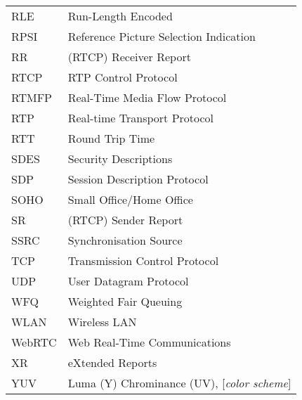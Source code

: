 \begin{longtable}{ll}
RLE  	& Run-Length Encoded \\
RPSI 	& Reference Picture Selection Indication \\
RR  	& (RTCP) Receiver Report \\
RTCP 	& RTP Control Protocol \\
RTMFP	& Real-Time Media Flow Protocol \\
RTP 	& Real-time Transport Protocol \\
RTT 	& Round Trip Time \\
SDES	& Security Descriptions \\
SDP 	& Session Description Protocol \\
SOHO 	& Small Office/Home Office \\
SR  	& (RTCP) Sender Report \\
SSRC	& Synchronisation Source \\
TCP 	& Transmission Control Protocol \\
UDP 	& User Datagram Protocol \\
WFQ 	& Weighted Fair Queuing \\
WLAN	& Wireless LAN \\
WebRTC	& Web Real-Time Communications \\
XR  	& eXtended Reports \\
YUV 	& Luma (Y) Chrominance (UV), [\textit{color scheme}] \\
\end{longtable}
